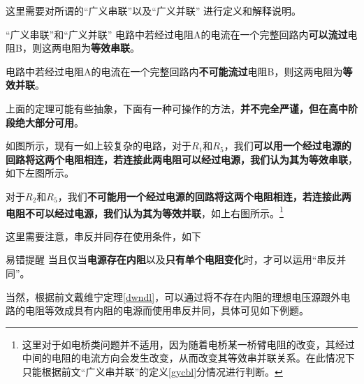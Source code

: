 这里需要对所谓的“广义串联”以及“广义并联” 进行定义和解释说明。

\begin{defi}[label=gycbl]{“广义串联”和“广义并联”}{}
电路中若经过电阻A的电流在一个完整回路内\textbf{可以流过}电阻B，则这两电阻为\textbf{等效串联}。

电路中若经过电阻A的电流在一个完整回路内\textbf{不可能流过}电阻B，则这两电阻为\textbf{等效并联}。
\end{defi}

上面的定理可能有些抽象，下面有一种可操作的方法，\textbf{并不完全严谨，但在高中阶段绝大部分可用}。



如图所示，现有一如上较复杂的电路，对于$R_1$和$R_5$，我们\textbf{可以用一个经过电源的回路将这两个电阻相连，若连接此两电阻可以经过电源，我们认为其为等效串联}，如下左图所示。

\begin{minipage}[b]{0.45\linewidth}

\end{minipage}
\hfill
\begin{minipage}[b]{0.45\linewidth}

\end{minipage}

对于$R_2$和$R_5$，我们\textbf{不可能用一个经过电源的回路将这两个电阻相连，若连接此两电阻不可以经过电源，我们认为其为等效并联}，如上右图所示。\footnote{这里对于如电桥类问题并不适用，因为随着电桥某一桥臂电阻的改变，其经过中间的电阻的电流方向会发生改变，从而改变其等效串并联关系。在此情况下只能根据前文“广义串并联”的定义\eqref{gycbl}分情况进行判断。}

这里需要注意，串反并同存在使用条件，如下

\begin{mk}{易错提醒}{}
当且仅当\textbf{电源存在内阻}以及\textbf{只有单个电阻变化}时，才可以运用“串反并同”。
\end{mk}

当然，根据前文戴维宁定理\eqref{dwndl}，可以通过将不存在内阻的理想电压源跟外电路的电阻等效成具有内阻的电源而使用串反并同，具体可见如下例题。

